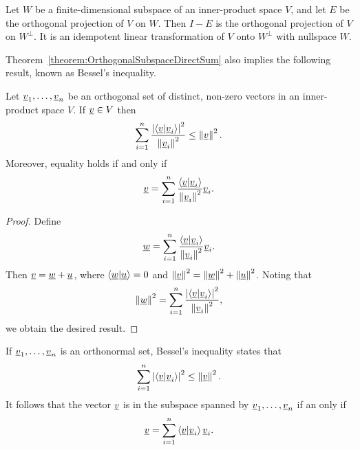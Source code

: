 \begin{corollary}
Let $W$ be a finite-dimensional subspace of an inner-product space $V$, and let $E$ be the orthogonal projection of $V$ on $W$.
Then $I - E$ is the orthogonal projection of $V$ on $W^{\bot}$.
It is an idempotent linear transformation of $V$ onto $W^{\bot}$ with nullspace $W$.
\end{corollary}

Theorem~\ref{theorem:OrthogonalSubspaceDirectSum} also implies the following result, known as Bessel's inequality.

\begin{corollary}
Let $\underline{v}_1, \ldots, \underline{v}_n$ be an orthogonal set of distinct, non-zero vectors in an inner-product space $V$.
If $\underline{v} \in V$ then
\begin{equation*}
\sum_{i=1}^n \frac{ \left| \left\langle \underline{v} | \underline{v}_i \right\rangle \right|^2 }{ \left\| \underline{v}_i \right\|^2 }
\leq \left\| \underline{v} \right\|^2.
\end{equation*}
Moreover, equality holds if and only if
\begin{equation*}
\underline{v} = \sum_{i=1}^n \frac{ \left\langle \underline{v} | \underline{v}_i \right\rangle }{ \left\| \underline{v}_i \right\|^2 } \underline{v}_i.
\end{equation*}
\end{corollary}
\begin{proof}
Define
\begin{equation*}
\underline{w} = \sum_{i=1}^n \frac{ \left\langle \underline{v} | \underline{v}_i \right\rangle }{ \left\| \underline{v}_i \right\|^2 } \underline{v}_i.
\end{equation*}
Then $\underline{v} = \underline{w} + \underline{u}$, where $\left\langle \underline{w} | \underline{u} \right\rangle = 0$ and $\left\| \underline{v} \right\|^2 = \left\| \underline{w} \right\|^2 + \left\| \underline{u} \right\|^2$.
Noting that
\begin{equation*}
\left\| \underline{w} \right\|^2
= \sum_{i=1}^n \frac{ \left| \left\langle \underline{v} | \underline{v}_i \right\rangle \right|^2 }{ \left\| \underline{v}_i \right\|^2 },
\end{equation*}
we obtain the desired result.
\end{proof}

If $\underline{v}_1, \ldots, \underline{v}_n$ is an orthonormal set, Bessel's inequality states that
\begin{equation*}
\sum_{i=1}^n \left| \left\langle \underline{v} | \underline{v}_i \right\rangle \right|^2 \leq \left\| \underline{v} \right\|^2.
\end{equation*}
It follows that the vector $\underline{v}$ is in the subspace spanned by $\underline{v}_1, \ldots, \underline{v}_n$ if an only if
\begin{equation*}
\underline{v} = \sum_{i=1}^n \left\langle \underline{v} | \underline{v}_i \right\rangle \underline{v}_i.
\end{equation*}


